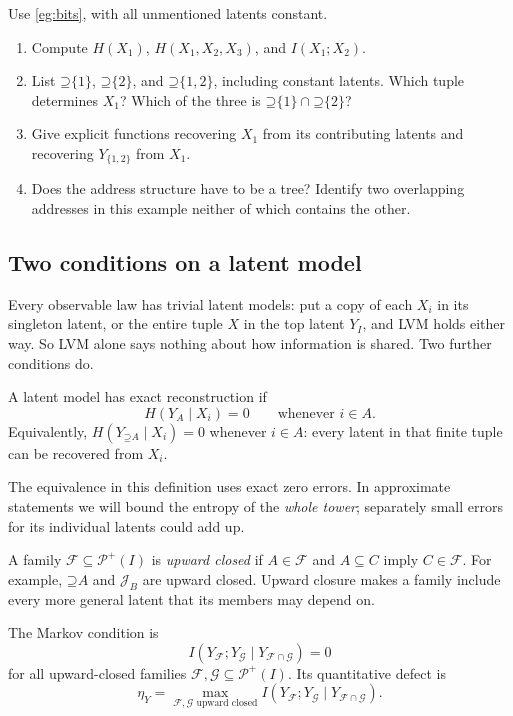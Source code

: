 \documentclass[11pt]{article}
\newcommand{\PI}{\mathcal{P}^{+}(I)}
\newcommand{\Up}{\mathord{\supseteq}}
\begin{document}
\begin{exercise}
\label{ex:bits}\important
Use \cref{eg:bits}, with all unmentioned latents constant.
\begin{enumerate}
\item Compute $H(X_1)$, $H(X_1,X_2,X_3)$, and $I(X_1;X_2)$.
\item List $\Up\{1\}$, $\Up\{2\}$, and $\Up\{1,2\}$, including
constant latents. Which tuple determines $X_1$? Which of the three is
$\Up\{1\}\cap\Up\{2\}$?
\item Give explicit functions recovering $X_1$ from its contributing latents
and recovering $Y_{\{1,2\}}$ from $X_1$.
\item Does the address structure have to be a tree? Identify two overlapping
addresses in this example neither of which contains the other.
\end{enumerate}
\end{exercise}

\subsection{Two conditions on a latent model}
\label{sec:conditions}
Every observable law has trivial latent models: put a copy of each $X_i$ in its
singleton latent, or the entire tuple $X$ in the top latent $Y_I$, and LVM
holds either way. So LVM alone says nothing about how information is shared.
Two further conditions do.

\begin{definition}[Reconstruction]
\label{def:reconstruction}
A latent model has exact reconstruction if
\[
 H(Y_A\mid X_i)=0\qquad\text{whenever }i\in A.
\]
Equivalently, $H(Y_{\Up A}\mid X_i)=0$ whenever $i\in A$: every latent
in that finite tuple can be recovered from $X_i$.
\end{definition}

The equivalence in this definition uses exact zero errors. In approximate
statements we will bound the entropy of the \emph{whole tower}; separately small
errors for its individual latents could add up.

A family $\mathcal{F}\subseteq\PI$ is \emph{upward closed} if
$A\in\mathcal{F}$ and $A\subseteq C$ imply $C\in\mathcal{F}$.
For example, $\Up A$ and $\mathcal{J}_B$ are upward closed. Upward closure
makes a family include every more general latent that its members may depend
on.

\begin{definition}
\label{def:markov}
The Markov condition is
\[
 I(Y_{\mathcal{F}};Y_{\mathcal{G}}\mid
 Y_{\mathcal{F}\cap\mathcal{G}})=0
\]
for all upward-closed families $\mathcal{F},\mathcal{G}\subseteq\PI$.
Its quantitative defect is
\[
 \eta_Y=\max_{\mathcal{F},\mathcal{G}\text{ upward closed}}
 I(Y_{\mathcal{F}};Y_{\mathcal{G}}\mid Y_{\mathcal{F}\cap\mathcal{G}}).
\]
\end{definition}
\end{document}
